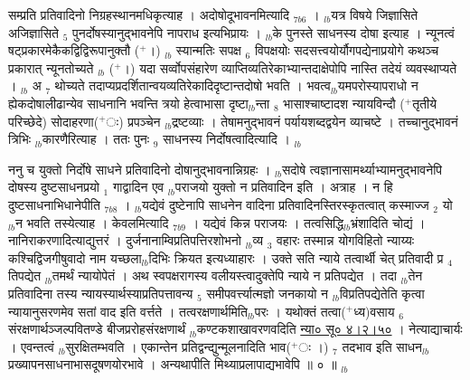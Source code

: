 \documentclass[article,12pt,a4paper]{memoir}%
\newcommand{\add}[1]{($^{+}$#1)}
\newcounter{parCount}
\begin{document}
	  
	  \pstart \leavevmode%
	\hphantom{.}सम्प्रति प्रतिवादिनो निग्रहस्थानमधिकृत्याह । {\color{DodgerBlue3}अदोषोदूभावनमित्यादि} {\tiny $_{7b6}$} । {\tiny $_{lb}$}यत्र विषये जिज्ञासिते अजिज्ञासिते {\tiny $_{5}$} पुनर्दोषस्यानुद्भावनेपि नापराध इत्यभिप्रायः । {\tiny $_{lb}$}के पुनस्ते साधनस्य दोषा इत्याह । न्यूनत्वं षट्प्रकारमेकैकद्विद्विरूपानुक्तौ \add{।} {\tiny $_{lb}$} स्यान्मतिः सपक्ष {\tiny $_{6}$} विपक्षयोः सदसत्त्वयोर्यौगपद्येनाप्रयोगे कथञ्च प्रकारात् न्यूनतोच्यते {\tiny $_{lb}$} \add{।} यदा सर्व्वोपसंहारेण व्याप्तिव्यतिरेकाभ्यान्तदाक्षेपोपि नास्ति तदेयं व्यवस्थाप्यते । {\tiny $_{lb}$} \leavevmode{} अ {\tiny $_{7}$} थोच्यते तदाप्यप्रदर्शितान्वयव्यतिरेकादिदृष्टान्तदोषो भवति । भवत्व{\tiny $_{lb}$}यमपरोस्यापराधो न ह्येकदोषालीढान्येव साधनानि भवन्ति त्रयो हेत्वाभासा दृष्टा{\tiny $_{lb}$}न्ता {\tiny $_{8}$} \leavevmode{} भासाश्चाष्टादश {\color{DodgerBlue3}न्यायविन्दौ} \add{तृतीये परिच्छेदे} सोदाहरणा\add{ः} प्रपञ्चेन {\tiny $_{lb}$}द्रष्टव्याः । तेषामनुद्भावनं पर्यायशब्दद्वयेन व्याचष्टे । तच्चानुद्भावनं त्रिभिः {\tiny $_{lb}$}कारणैरित्याह । ततः पुनः {\color{DodgerBlue3}{\tiny $_{9}$} साधनस्य निर्दोषत्वादित्यादि} ।
	{}
	\pend%
      {\tiny $_{lb}$}

	  
	  \pstart \leavevmode%
	ननु च युक्तो निर्दोषे साधने प्रतिवादिनो दोषानुद्भावनान्निग्रहः । {\tiny $_{lb}$}सदोषे त्वज्ञानासामर्थ्याभ्यामनुद्भावनेपि दोषस्य दुष्टसाधनप्रयो {\tiny $_{1}$} गाद्वादिन एव {\tiny $_{lb}$}पराजयो युक्तो न प्रतिवादिन इति । अत्राह । {\color{DodgerBlue3}न हि दुष्टसाधनाभिधानेपीति} {\tiny $_{7b8}$} । {\tiny $_{lb}$}यद्येवं दुष्टेनापि साधनेन वादिना प्रतिवादिनस्तिरस्कृतत्वात् कस्माज्ज {\tiny $_{2}$} यो {\tiny $_{lb}$}न भवति तस्येत्याह । {\color{DodgerBlue3}केवलमित्यादि} {\tiny $_{7b9}$} । यद्येवं किन्न पराजयः । तत्वसिद्धि{\tiny $_{lb}$}भ्रंशादिति चोद्यं । नानिराकरणादित्याद्युत्तरं । दुर्जनानाम्विप्रतिपत्तिरशोभनो {\tiny $_{lb}$}व्य {\tiny $_{3}$} वहारः तस्मान्न योगविहितो न्याय्यः कश्चिद्विजगीषुवादो नाम यच्छला{\tiny $_{lb}$}दिभिः क्रियत इत्यध्याहारः । उक्ते सति न्याये तत्वार्थी चेत् प्रतिवादी प्र {\tiny $_{4}$} तिपद्येत {\tiny $_{lb}$}तमर्थं न्यायोपेतं । अथ स्वपक्षरागस्य वलीयस्त्वादुक्तेपि न्याये न प्रतिपद्येत । तदा {\tiny $_{lb}$}तेन प्रतिवादिना तस्य न्यायस्यार्थस्याप्रतिपत्तावन्य {\tiny $_{5}$} समीपवर्त्त्यात्मज्ञो जनकायो न {\tiny $_{lb}$}विप्रतिपद्येतेति कृत्वा न्यायानुसरणमेव सतां वाद इति वर्त्तते । तत्वरक्षणार्थमिति{\tiny $_{lb}$}परः । यथोक्तं तत्वा\add{ध्य}वसाय {\tiny $_{6}$} संरक्षणार्थञ्जल्पवितण्डे बीजप्ररोहसंरक्षणार्थं {\tiny $_{lb}$}कण्टकशाखावरणवदिति \href{http://sarit.indology.info/?cref=ns\%C5\%AB.4.2.50}{न्या० सू० ४।२।५०} । नेत्याद्याचार्यः । एवन्तत्वं {\tiny $_{lb}$}सुरक्षितम्भवति । एकान्तेन प्रतिद्वन्द्युन्मूलनादिति भाव\add{ः ।} {\tiny $_{7}$} तदभाव इति साधन{\tiny $_{lb}$}प्रख्यापनसाधनाभासदूषणयोरभावे । अन्यथापीति मिथ्याप्रलापाद्यभावेपि ॥ ० ॥
	{}
	\pend%
      {\tiny $_{lb}$}
\end{document}
